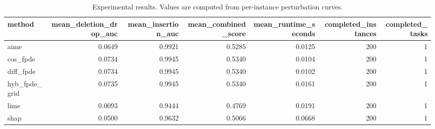 \begin{table}[t]
\caption{Experimental results. Values are computed from per-instance perturbation curves.}
\label{tab:main_results_computed}
\centering
\begin{tabular}{lrrrrrr}
\toprule
method & mean\_deletion\_drop\_auc & mean\_insertion\_auc & mean\_combined\_score & mean\_runtime\_seconds & completed\_instances & completed\_tasks \\
\midrule
aime & 0.0649 & 0.9921 & 0.5285 & 0.0125 & 200 & 1 \\
cos\_fpde & 0.0734 & 0.9945 & 0.5340 & 0.0104 & 200 & 1 \\
diff\_fpde & 0.0734 & 0.9945 & 0.5340 & 0.0102 & 200 & 1 \\
hyb\_fpde\_grid & 0.0735 & 0.9945 & 0.5340 & 0.0161 & 200 & 1 \\
lime & 0.0093 & 0.9444 & 0.4769 & 0.0191 & 200 & 1 \\
shap & 0.0500 & 0.9632 & 0.5066 & 0.0668 & 200 & 1 \\
\bottomrule
\end{tabular}

\end{table}
